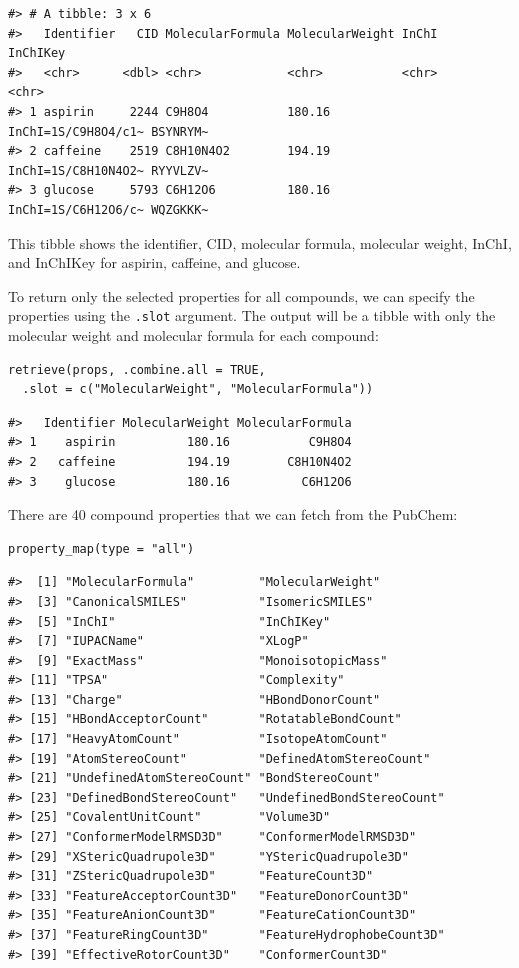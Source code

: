 \begin{verbatim}
#> # A tibble: 3 x 6
#>   Identifier   CID MolecularFormula MolecularWeight InChI               InChIKey
#>   <chr>      <dbl> <chr>            <chr>           <chr>               <chr>   
#> 1 aspirin     2244 C9H8O4           180.16          InChI=1S/C9H8O4/c1~ BSYNRYM~
#> 2 caffeine    2519 C8H10N4O2        194.19          InChI=1S/C8H10N4O2~ RYYVLZV~
#> 3 glucose     5793 C6H12O6          180.16          InChI=1S/C6H12O6/c~ WQZGKKK~
\end{verbatim}

This tibble shows the identifier, CID, molecular formula, molecular weight, InChI, and InChIKey for aspirin, caffeine, and glucose.

To return only the selected properties for all compounds, we can specify the properties using the \texttt{.slot} argument. The output will be a tibble with only the molecular weight and molecular formula for each compound:

\begin{verbatim}
retrieve(props, .combine.all = TRUE,
  .slot = c("MolecularWeight", "MolecularFormula"))
\end{verbatim}

\begin{verbatim}
#>   Identifier MolecularWeight MolecularFormula
#> 1    aspirin          180.16           C9H8O4
#> 2   caffeine          194.19        C8H10N4O2
#> 3    glucose          180.16          C6H12O6
\end{verbatim}

There are 40 compound properties that we can fetch from the PubChem:

\begin{verbatim}
property_map(type = "all")
\end{verbatim}

\begin{verbatim}
#>  [1] "MolecularFormula"         "MolecularWeight"         
#>  [3] "CanonicalSMILES"          "IsomericSMILES"          
#>  [5] "InChI"                    "InChIKey"                
#>  [7] "IUPACName"                "XLogP"                   
#>  [9] "ExactMass"                "MonoisotopicMass"        
#> [11] "TPSA"                     "Complexity"              
#> [13] "Charge"                   "HBondDonorCount"         
#> [15] "HBondAcceptorCount"       "RotatableBondCount"      
#> [17] "HeavyAtomCount"           "IsotopeAtomCount"        
#> [19] "AtomStereoCount"          "DefinedAtomStereoCount"  
#> [21] "UndefinedAtomStereoCount" "BondStereoCount"         
#> [23] "DefinedBondStereoCount"   "UndefinedBondStereoCount"
#> [25] "CovalentUnitCount"        "Volume3D"                
#> [27] "ConformerModelRMSD3D"     "ConformerModelRMSD3D"    
#> [29] "XStericQuadrupole3D"      "YStericQuadrupole3D"     
#> [31] "ZStericQuadrupole3D"      "FeatureCount3D"          
#> [33] "FeatureAcceptorCount3D"   "FeatureDonorCount3D"     
#> [35] "FeatureAnionCount3D"      "FeatureCationCount3D"    
#> [37] "FeatureRingCount3D"       "FeatureHydrophobeCount3D"
#> [39] "EffectiveRotorCount3D"    "ConformerCount3D"
\end{verbatim}

